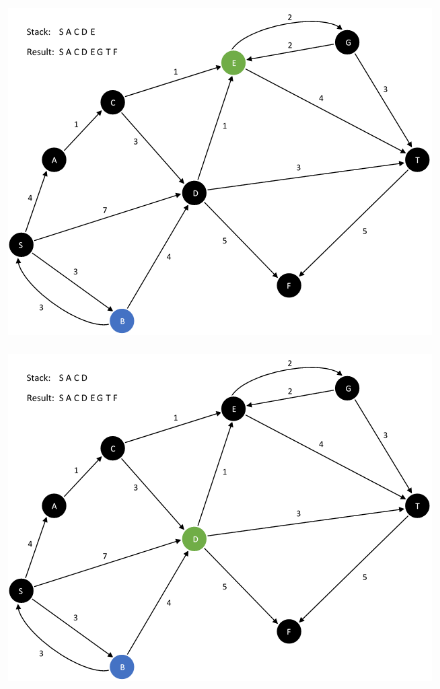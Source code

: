 \documentclass{article}
\begin{document}
\begin{enumerate}[leftmargin=\labelsep]
\begin{figure}[H]
\centering
\includegraphics[scale=0.6]{images/Q5/a/11.png}
\end{figure}

\begin{figure}[H]
\centering
\includegraphics[scale=0.6]{images/Q5/a/12.png}
\end{figure}


\end{enumerate}
\end{document}
